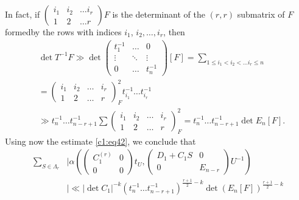 In fact, if $\left(\begin{smallmatrix} i_{1} & i_{2} & \ldots
  i_{r}\\ 1 & 2 & \ldots r\end{smallmatrix}\right)F$ is the
  determinant of the $(r,r)$ submatrix of $F$
formed\pageoriginale by the rows with indices $i_{1}$,
$i_{2},\ldots,i_{r}$, then
\begin{align*}
& \det T^{-1}F\gg \det
\begin{pmatrix}
t^{-1}_{1} & \ldots & 0\\
\vdots & \ddots & \vdots\\
0 & \ldots & t^{-1}_{n}
\end{pmatrix}
[F]
=\sum_{1\leq i_{1}<i_{2}<\ldots i_{r}\leq n}\\
&=
\begin{pmatrix}
i_{1} & i_{2} & \ldots & i_{r}\\
1 & 2 & \ldots & r
\end{pmatrix}^{2}_{F}t^{-1}_{i_{1}}\ldots t^{-1}_{i_{r}}\\
&\gg t^{-1}_{n}\ldots t^{-1}_{n-r+1}\sum 
\begin{pmatrix}
i_{1} & i_{2} & \ldots & i_{r}\\
1 & 2 & \ldots & r
\end{pmatrix}^{2}_{F}=t^{-1}_{n}\ldots t^{-1}_{n-r+1}\det E_{n}[F].
\end{align*}
Using now the estimate \eqref{c1:eq42}, we conclude that
\begin{align*}
\sum_{S\in\Lambda_{r}}&|\alpha\left(
\begin{pmatrix}
C^{(r)}_{1} & 0\\
0 & 0
\end{pmatrix}
t_{U},
\begin{pmatrix}
D_{1}+C_{1}S & 0\\
0 & E_{n-r}
\end{pmatrix}
U^{-1}
\right)\\
&|\ll |\det C_{1} |^{-k}(t^{-1}_{n}\ldots t^{-1}_{n-r+1})^{\frac{r+1}{2}-k}\det (E_{n}[F])^{\frac{r+1}{2}-k}
\end{align*}


